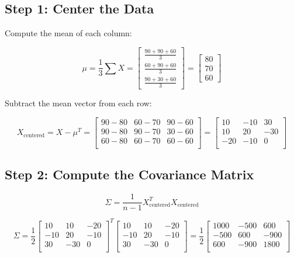 \documentclass[a4paper,12pt]{article}
\begin{document}
\subsection*{Step 1: Center the Data}

Compute the mean of each column:

\[
\mu = \frac{1}{3} \sum X = 
\begin{bmatrix}
\frac{90 + 90 + 60}{3} \\
\frac{60 + 90 + 60}{3} \\
\frac{90 + 30 + 60}{3}
\end{bmatrix}
=
\begin{bmatrix}
80 \\
70 \\
60
\end{bmatrix}
\]

Subtract the mean vector from each row:

\[
X_{\text{centered}} = X - \mu^T = 
\begin{bmatrix}
90 - 80 & 60 - 70 & 90 - 60 \\
90 - 80 & 90 - 70 & 30 - 60 \\
60 - 80 & 60 - 70 & 60 - 60 \\
\end{bmatrix}
=
\begin{bmatrix}
10 & -10 & 30 \\
10 & 20 & -30 \\
-20 & -10 & 0 \\
\end{bmatrix}
\]

\subsection*{Step 2: Compute the Covariance Matrix}

\[
\Sigma = \frac{1}{n-1} X_{\text{centered}}^T X_{\text{centered}}
\]

\[
\Sigma = \frac{1}{2}
\begin{bmatrix}
10 & 10 & -20 \\
-10 & 20 & -10 \\
30 & -30 & 0 \\
\end{bmatrix}^T
\begin{bmatrix}
10 & 10 & -20 \\
-10 & 20 & -10 \\
30 & -30 & 0 \\
\end{bmatrix}
= \frac{1}{2}
\begin{bmatrix}
1000 & -500 & 600 \\
-500 & 600 & -900 \\
600 & -900 & 1800 \\
\end{bmatrix}
\]
\end{document}
